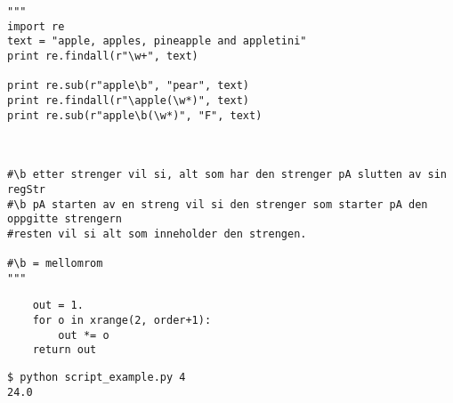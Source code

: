 \begin{Verbatim}
"""
import re
text = "apple, apples, pineapple and appletini"
print re.findall(r"\w+", text)

print re.sub(r"apple\b", "pear", text) 
print re.findall(r"\apple(\w*)", text) 
print re.sub(r"apple\b(\w*)", "F", text)



#\b etter strenger vil si, alt som har den strenger pA slutten av sin regStr
#\b pA starten av en streng vil si den strenger som starter pA den oppgitte strengern
#resten vil si alt som inneholder den strengen.

#\b = mellomrom
"""

\end{Verbatim}
\begin{Verbatim}
    out = 1.
    for o in xrange(2, order+1):
        out *= o
    return out 
\end{Verbatim}
\begin{Verbatim}
$ python script_example.py 4
24.0
\end{Verbatim}
